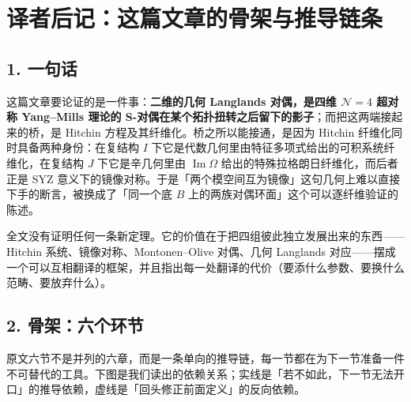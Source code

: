 {}
\section*{译者后记：这篇文章的骨架与推导链条}

\subsection*{1. 一句话}

这篇文章要论证的是一件事：\textbf{二维的几何 Langlands 对偶，是四维 $\mathcal{N}=4$ 超对称 Yang--Mills 理论的 S-对偶在某个拓扑扭转之后留下的影子}；而把这两端接起来的桥，是 Hitchin 方程及其纤维化。桥之所以能接通，是因为 Hitchin 纤维化同时具备两种身份：在复结构 $I$ 下它是代数几何里由特征多项式给出的可积系统纤维化，在复结构 $J$ 下它是辛几何里由 $\operatorname{Im}\Omega$ 给出的特殊拉格朗日纤维化，而后者正是 SYZ 意义下的镜像对称\cite{Strominger1996}。于是「两个模空间互为镜像」这句几何上难以直接下手的断言，被换成了「同一个底 $B$ 上的两族对偶环面」这个可以逐纤维验证的陈述\cite{HauselThaddeus2002}。

全文没有证明任何一条新定理。它的价值在于把四组彼此独立发展出来的东西——Hitchin 系统、镜像对称、Montonen--Olive 对偶、几何 Langlands 对应——摆成一个可以互相翻译的框架，并且指出每一处翻译的代价（要添什么参数、要换什么范畴、要放弃什么）。

\subsection*{2. 骨架：六个环节}

原文六节不是并列的六章，而是一条单向的推导链，每一节都在为下一节准备一件不可替代的工具。下图是我们读出的依赖关系；实线是「若不如此，下一节无法开口」的推导依赖，虚线是「回头修正前面定义」的反向依赖。

